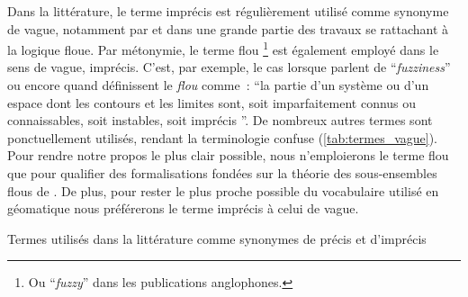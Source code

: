 Dans la littérature, le terme imprécis est régulièrement utilisé comme
synonyme de vague, notamment par \textcite{Zadeh1965} et dans une
grande partie des travaux se rattachant à la logique floue. Par
métonymie, le terme flou \footnote{Ou
  \foreignquote{english}{\emph{fuzzy}} dans les publications
  anglophones.} est également employé dans le sens de vague,
imprécis. C’est, par exemple, le cas lorsque \textcite{Lagacherie1996}
parlent de \enquote{\emph{fuzziness}} ou encore quand
\textcite[218]{Brunet1992} définissent le \emph{flou} comme :
\enquote{la partie d’un système ou d’un espace dont les contours et
  les limites sont, soit imparfaitement connus ou connaissables, soit
  instables, soit imprécis \textelp{}}. De nombreux autres termes sont
ponctuellement utilisés, rendant la terminologie confuse
(\autoref{tab:termes_vague}). Pour rendre notre propos le plus clair
possible, nous n’emploierons le terme flou que pour qualifier des
formalisations fondées sur la théorie des sous-ensembles flous de
\textcite{Zadeh1965}. De plus, pour rester le plus proche possible du
vocabulaire utilisé en géomatique nous préférerons le terme imprécis à
celui de vague.

\begin{table}
  \centering
  
  \caption{Termes utilisés dans la littérature comme synonymes de
    précis et d’imprécis}
  \label{tab:termes_vague}
\end{table}

